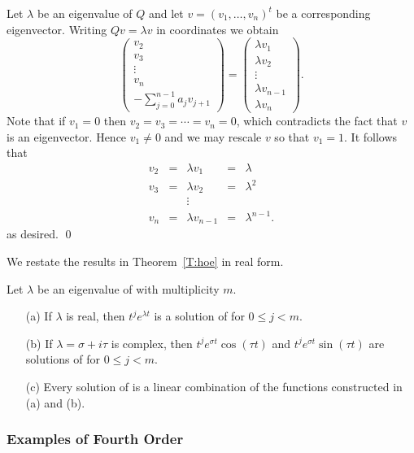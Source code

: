 \proof Let $\lambda$ be an eigenvalue of $Q$ and let 
$v=(v_1,\ldots,v_n)^t$ be a
corresponding eigenvector.  Writing $Qv = \lambda v$
in coordinates we obtain
\[
\left(\begin{array}{c}
v_2\\
v_3\\
\vdots\\
v_n\\
-\sum_{j=0}^{n-1} a_j v_{j+1}
\end{array}\right)=
\left(\begin{array}{c}
\lambda v_1\\
\lambda v_2\\
\vdots\\
\lambda v_{n-1}\\
\lambda v_n
\end{array}\right).
\]
Note that if $v_1=0$ then $v_2=v_3=\cdots =v_n=0$, which 
contradicts the fact that $v$ is an eigenvector.  Hence $v_1\neq 0$ 
and we may rescale $v$ so that $v_1=1$.  It follows that 
\[
\begin{array}{rclrl}
v_2 & = & \lambda v_1 & = & \lambda \\
v_3 & = & \lambda v_2 & = & \lambda^2 \\
& & \vdots & & \\ 
v_n & = & \lambda v_{n-1} & = & \lambda^{n-1}.
\end{array}
\]
as desired.  \qed

We restate the results in Theorem~\ref{T:hoe} in real form.
\begin{thm}   \label{thm:HOgen}
Let $\lambda$ be an eigenvalue of  with multiplicity $m$.
\begin{itemize}
\item[(a)] If $\lambda$ is real, then 
$t^je^{\lambda t}$ is a solution 
of  for $0\leq j < m$.  
\item[(b)] If $\lambda=\sigma+i\tau$ is complex, 
then $t^je^{\sigma t}\cos(\tau t)$ and $t^je^{\sigma t}\sin(\tau t)$ are 
solutions of  for $0\leq j < m$.
\item[(c)] Every solution of  is a linear combination of
the functions constructed 
in (a) and (b).
\end{itemize}
\end{thm}

\subsubsection*{Examples of Fourth Order}

